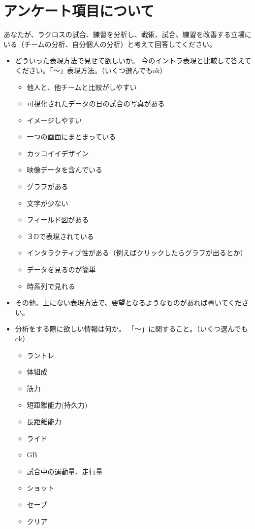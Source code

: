 \documentclass[sotsuron]{kuee}
\begin{document}
\chapter{アンケート項目について}
	あなたが、ラクロスの試合、練習を分析し、戦術、試合、練習を改善する立場にいる（チームの分析、自分個人の分析）と考えて回答してください。
	\begin{itemize}
		\item どういった表現方法で見せて欲しいか。
			今のイントラ表現と比較して答えてください。「〜」表現方法。（いくつ選んでもok）
			\begin{itemize}
				\item 他人と、他チームと比較がしやすい
				\item 可視化されたデータの日の試合の写真がある
				\item イメージしやすい
				\item 一つの画面にまとまっている
				\item カッコイイデザイン
				\item 映像データを含んでいる
				\item グラフがある
				\item 文字が少ない
				\item フィールド図がある
				\item ３Dで表現されている
				\item インタラクティブ性がある（例えばクリックしたらグラフが出るとか）
				\item データを見るのが簡単
				\item 時系列で見れる
			\end{itemize}
		\item その他、上にない表現方法で、要望となるようなものがあれば書いてください。
		\item 分析をする際に欲しい情報は何か。
			「〜」に関すること。（いくつ選んでもok）
			\begin{itemize}
				\item ラントレ
				\item 体組成
				\item 筋力
				\item 短距離能力(持久力)
				\item 長距離能力
				\item ライド
				\item GB
				\item 試合中の運動量、走行量
				\item ショット
				\item セーブ
				\item クリア

\end{itemize}
\end{itemize}
\end{document}
